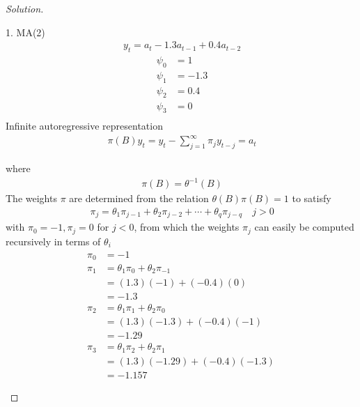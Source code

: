 \documentclass[UTF8,a4paper,14pt]{ctexart}
\newenvironment{solution}
  {\renewcommand\qedsymbol{$\blacksquare$}\begin{proof}[Solution]}
  {\end{proof}}
\theoremstyle{definition}
\theoremstyle{remark}
\begin{document}
\begin{solution}
\begin{mybox}{1. MA(2)}
    \begin{equation}\
      \begin{aligned}
        y_{t} = a_{t} - 1.3 a_{t-1} + 0.4 a_{t-2}
      \end{aligned}
    \end{equation}
    \begin{equation}\
      \begin{aligned}
        \psi_0&= 1\\
        \psi_1&= -1.3\\
        \psi_2&= 0.4\\
        \psi_3&= 0\\
      \end{aligned}
    \end{equation}
    Infinite autoregressive representation
    \begin{equation}\
      \begin{aligned}
        \pi(B)y_t = y_t -\sum_{j=1}^{\infty} \pi_j y_{t-j} =a_t
      \end{aligned}
    \end{equation}

    where
      \begin{equation}\
        \begin{aligned}
        \pi(B) = \theta^{-1}(B)
        \end{aligned}
      \end{equation}
      The weights \(\pi\) are determined from the relation \(\theta(B)\pi(B)= 1\) to satisfy
      \begin{equation}\
        \begin{aligned}
        \pi_j = \theta_1\pi_{j-1}+\theta_2\pi_{j-2}+\cdots+\theta_q\pi_{j-q}\quad j>0
        \end{aligned}
      \end{equation}
      with \(\pi_0 = -1, \pi_j = 0\) for \(j<0\), from which the weights \(\pi_j\) can easily be computed recursively in terms of \(\theta_i\)
      \begin{equation}
        \begin{aligned}
        \pi_0 &= -1\\
        \pi_1 &= \theta_1\pi_{0}+\theta_2\pi_{-1}\\
        &=(1.3)(-1)+(-0.4)(0)\\
        &=-1.3\\
        \pi_2 &= \theta_1\pi_{1}+\theta_2\pi_{0}\\
        &=(1.3)(-1.3)+(-0.4)(-1)\\
        &=-1.29\\
        \pi_3 &= \theta_1\pi_{2}+\theta_2\pi_{1}\\
        &=(1.3)(-1.29)+(-0.4)(-1.3)\\
        & = -1.157
        \end{aligned}
      \end{equation}


\end{mybox}
\end{solution}
\end{document}
